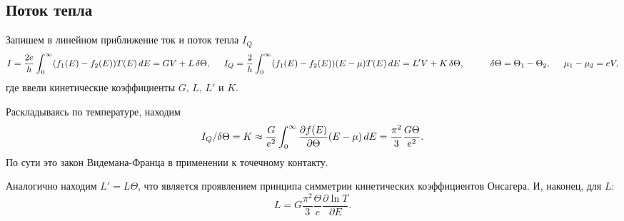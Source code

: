
\subsection{Поток тепла}

Запишем в линейном приближение ток и поток тепла $I_Q$
\begin{equation*}
	I = \frac{2e}{h} \int_{0}^{\infty} (f_1(E)-f_2(E))T(E)\d E= G V + L \,\delta \Theta,
	\hspace{5 mm} 
	I_Q = \frac{2}{h} \int_{0}^{\infty} (f_1(E)-f_2(E))(E-\mu)T(E)\d E = L' V + K\, \delta \Theta,
	\hspace{10 mm} 
	\delta \Theta = \Theta_1 - \Theta_2,
	\hspace{5 mm} 
	\mu_1-\mu_2= eV,
\end{equation*}
где ввели кинетические коэффициенты $G,\, L,\, L'$ и $K$. 

Раскладываясь по температуре, находим
\begin{equation*}
	I_Q / \delta \Theta = K \approx \frac{G}{e^2} \int_{0}^{\infty}  \frac{\partial f(E)}{\partial \Theta} (E-\mu) \, d E = \frac{\pi^2}{3} \frac{G \Theta}{e^2}.
\end{equation*}
По сути это закон Видемана-Франца в применении к точечному контакту. 

Аналогично находим $L' = L \Theta$, что является проявлением принципа симметрии кинетических коэффициентов Онсагера. И, наконец, для $L$:
\begin{equation*}
	L = G \frac{\pi^2}{3} \frac{\Theta}{e} \frac{\partial \ln T}{\partial E}.
\end{equation*}


















